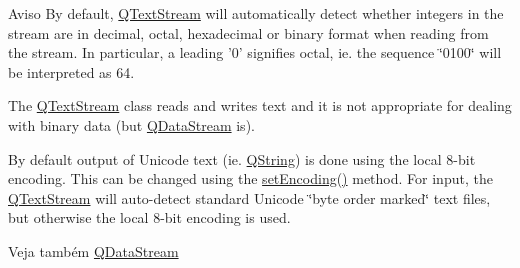 \begin{DoxyWarning}{Aviso}
By default, \hyperlink{class_q_text_stream}{Q\-Text\-Stream} will automatically detect whether integers in the stream are in decimal, octal, hexadecimal or binary format when reading from the stream. In particular, a leading '0' signifies octal, ie. the sequence \char`\"{}0100\char`\"{} will be interpreted as 64.
\end{DoxyWarning}
The \hyperlink{class_q_text_stream}{Q\-Text\-Stream} class reads and writes text and it is not appropriate for dealing with binary data (but \hyperlink{class_q_data_stream}{Q\-Data\-Stream} is).

By default output of Unicode text (ie. \hyperlink{class_q_string}{Q\-String}) is done using the local 8-\/bit encoding. This can be changed using the \hyperlink{class_q_text_stream_a0dcb70ff23e690c42a8c52280fa39d78}{set\-Encoding()} method. For input, the \hyperlink{class_q_text_stream}{Q\-Text\-Stream} will auto-\/detect standard Unicode \char`\"{}byte order marked\char`\"{} text files, but otherwise the local 8-\/bit encoding is used.

\begin{DoxySeeAlso}{Veja também}
\hyperlink{class_q_data_stream}{Q\-Data\-Stream} 
\end{DoxySeeAlso}


